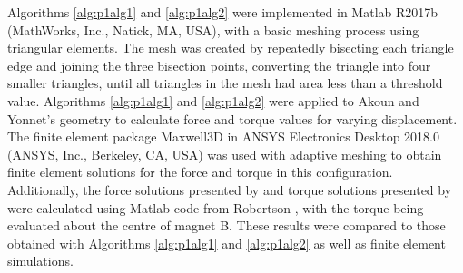 Algorithms \ref{alg:p1alg1} and \ref{alg:p1alg2} were implemented in Matlab R2017b (MathWorks, Inc., Natick, MA, USA), with a basic meshing process using triangular elements. The mesh was created by repeatedly bisecting each triangle edge and joining the three bisection points, converting the triangle into four smaller triangles, until all triangles in the mesh had area less than a threshold value. Algorithms \ref{alg:p1alg1} and \ref{alg:p1alg2} were applied to Akoun and Yonnet's geometry \cite{Akoun1984} to calculate force and torque values for varying displacement. The finite element package Maxwell3D in ANSYS Electronics Desktop 2018.0 (ANSYS, Inc., Berkeley, CA, USA) was used with adaptive meshing to obtain finite element solutions for the force and torque in this configuration. Additionally, the force solutions presented by \textcite{Akoun1984} and torque solutions presented by \textcite{Janssen2010a} were calculated using Matlab code from Robertson \cite{Robertson2013,Robertson}, with the torque being evaluated about the centre of magnet B. These results were compared to those obtained with Algorithms \ref{alg:p1alg1} and \ref{alg:p1alg2} as well as finite element simulations.
